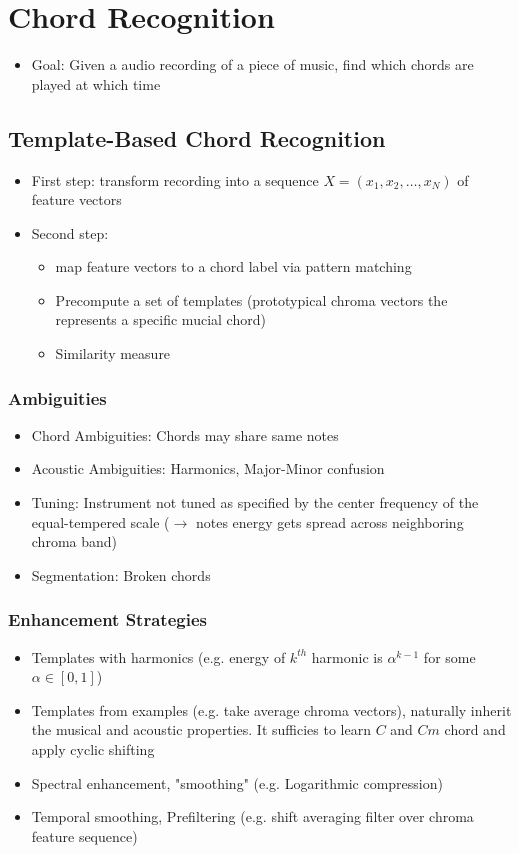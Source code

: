 \documentclass{scrartcl}
\begin{document}
\section{Chord Recognition}
\begin{itemize}
    \item
        Goal: Given a audio recording of a piece of music, find which chords are played at which time
\end{itemize}
\subsection{Template-Based Chord Recognition}
\begin{itemize}
    \item
        First step: transform recording into a sequence $X = (x_1, x_2, \dots, x_N)$ of feature vectors
    \item
        Second step: 

        \begin{itemize}
            \item 
                map feature vectors to a chord label via pattern matching
            \item
                Precompute a set of templates (prototypical chroma vectors the represents a specific mucial chord)
            \item
                Similarity measure
        \end{itemize}
\end{itemize}
\subsubsection*{Ambiguities}
\begin{itemize}
    \item
        Chord Ambiguities: Chords may share same notes
    \item
        Acoustic Ambiguities: Harmonics, Major-Minor confusion 
    \item
        Tuning: Instrument not tuned as specified by the center frequency of the equal-tempered scale ($\rightarrow$ notes energy gets spread across neighboring chroma band)
    \item
        Segmentation: Broken chords
\end{itemize}
\subsubsection*{Enhancement Strategies}
\begin{itemize}
    \item
        Templates with harmonics (e.g. energy of $k^{th}$ harmonic is $\alpha^{k-1}$ for some $\alpha \in [0,1]$)
    \item
        Templates from examples (e.g. take average chroma vectors), naturally inherit the musical and acoustic properties. It sufficies to learn $C$ and $Cm$ chord and apply cyclic shifting
    \item
        Spectral enhancement, "smoothing" (e.g. Logarithmic compression)
    \item
        Temporal smoothing, Prefiltering (e.g. shift averaging filter over chroma feature sequence)
\end{itemize}
\end{document}
